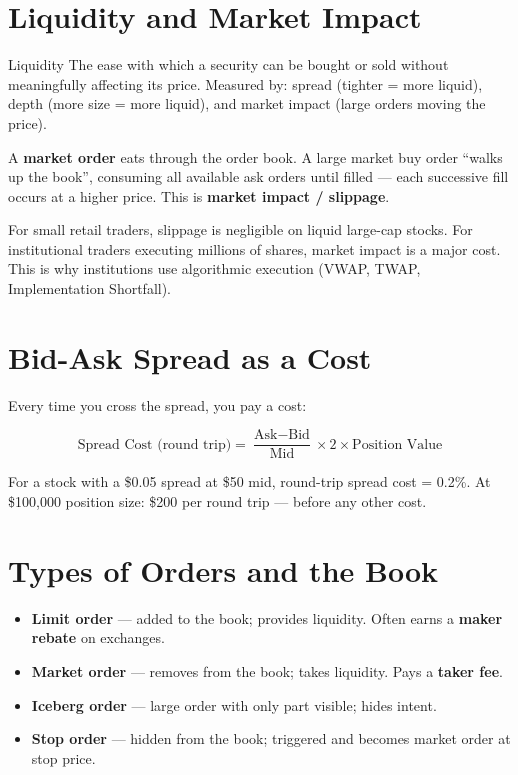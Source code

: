 \section{Liquidity and Market Impact}

\begin{keyterm}{Liquidity}
The ease with which a security can be bought or sold without meaningfully affecting its price.
Measured by: spread (tighter = more liquid), depth (more size = more liquid), and
market impact (large orders moving the price).
\end{keyterm}

A \textbf{market order} eats through the order book. A large market buy order
``walks up the book'', consuming all available ask orders until filled — each successive fill
occurs at a higher price. This is \textbf{market impact / slippage}.

\begin{notebox}
For small retail traders, slippage is negligible on liquid large-cap stocks.
For institutional traders executing millions of shares, market impact is a major cost.
This is why institutions use algorithmic execution (VWAP, TWAP, Implementation Shortfall).
\end{notebox}

\section{Bid-Ask Spread as a Cost}

Every time you cross the spread, you pay a cost:

\begin{formulabox}
\[
  \text{Spread Cost (round trip)} = \frac{\text{Ask} - \text{Bid}}{\text{Mid}} \times 2 \times \text{Position Value}
\]
\end{formulabox}

For a stock with a \$0.05 spread at \$50 mid, round-trip spread cost = 0.2\%.
At \$100{,}000 position size: \$200 per round trip — before any other cost.

\section{Types of Orders and the Book}

\begin{itemize}
  \item \textbf{Limit order} — added to the book; provides liquidity. Often earns a
        \textbf{maker rebate} on exchanges.
  \item \textbf{Market order} — removes from the book; takes liquidity. Pays a
        \textbf{taker fee}.
  \item \textbf{Iceberg order} — large order with only part visible; hides intent.
  \item \textbf{Stop order} — hidden from the book; triggered and becomes market order at stop price.
\end{itemize}

